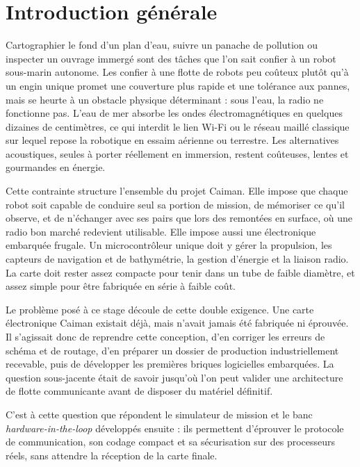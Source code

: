 \chapter{Introduction générale}
\label{chap:introduction}

Cartographier le fond d'un plan d'eau, suivre un panache de pollution ou inspecter un ouvrage immergé sont des tâches que l'on sait confier à un robot sous-marin autonome. Les confier à une flotte de robots peu coûteux plutôt qu'à un engin unique promet une couverture plus rapide et une tolérance aux pannes, mais se heurte à un obstacle physique déterminant : sous l'eau, la radio ne fonctionne pas. L'eau de mer absorbe les ondes électromagnétiques en quelques dizaines de centimètres, ce qui interdit le lien Wi-Fi ou le réseau maillé classique sur lequel repose la robotique en essaim aérienne ou terrestre. Les alternatives acoustiques, seules à porter réellement en immersion, restent coûteuses, lentes et gourmandes en énergie.

Cette contrainte structure l'ensemble du projet Caiman. Elle impose que chaque robot soit capable de conduire seul sa portion de mission, de mémoriser ce qu'il observe, et de n'échanger avec ses pairs que lors des remontées en surface, où une radio bon marché redevient utilisable. Elle impose aussi une électronique embarquée frugale. Un microcontrôleur unique doit y gérer la propulsion, les capteurs de navigation et de bathymétrie, la gestion d'énergie et la liaison radio. La carte doit rester assez compacte pour tenir dans un tube de faible diamètre, et assez simple pour être fabriquée en série à faible coût.

Le problème posé à ce stage découle de cette double exigence. Une carte électronique Caiman existait déjà, mais n'avait jamais été fabriquée ni éprouvée. Il s'agissait donc de reprendre cette conception, d'en corriger les erreurs de schéma et de routage, d'en préparer un dossier de production industriellement recevable, puis de développer les premières briques logicielles embarquées. La question sous-jacente était de savoir jusqu'où l'on peut valider une architecture de flotte communicante avant de disposer du matériel définitif.

C'est à cette question que répondent le simulateur de mission et le banc \emph{hardware-in-the-loop} développés ensuite : ils permettent d'éprouver le protocole de communication, son codage compact et sa sécurisation sur des processeurs réels, sans attendre la réception de la carte finale.

